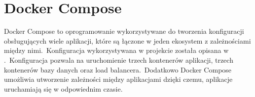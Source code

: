 

\clearpage
\section{Docker Compose}
Docker Compose \cite{DocCom2023} to oprogramowanie wykorzystywane do tworzenia konfiguracji obsługujących wiele aplikacji, które są łączone w jeden ekosystem z zależnościami między nimi.\  Konfiguracja wykorzystywana w projekcie została opisana w .\ Konfiguracja pozwala na uruchomienie trzech kontenerów aplikacji, trzech kontenerów bazy danych oraz load balancera.\ Dodatkowo Docker Compose umożliwia utworzenie zależności między aplikacjami dzięki czemu, aplikacje uruchamiają się w odpowiednim czasie.


